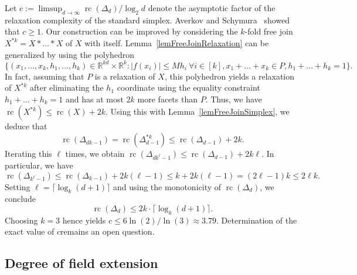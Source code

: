 \documentclass[11pt]{article}
\newcommand{\rc}{\operatorname{rc}}
\newcommand{\R}{\mathbb{R}}
\begin{document}
Let $c := \limsup_{d \to \infty} \rc(\Delta_d)/\log_2 d$ denote the asymptotic factor of the relaxation complexity of the standard simplex.
Averkov and Schymura~\cite{Averkov2022} showed that $c \ge 1$.
Our construction can be improved by considering the $k$-fold free join $X^{\ast k} = X \ast \dots \ast X$ of $X$ with itself.
Lemma~\ref{lemFreeJoinRelaxation} can be generalized by using the polyhedron
\[
    \{(x_1, \dots, x_k, h_1, \dots, h_k) \in \R^{kd} \times \R^k: |f(x_i)| \le M h_i \ \forall i \in [k], x_1 + \dots + x_k \in P, h_1 + \dots + h_k = 1 \}.
\]
In fact, assuming that $P$ is a relaxation of $X$, this
polyhedron yields a relaxation of $X^{\ast k}$ after eliminating the $h_1$ coordinate using the equality constraint $h_1 + \dots + h_k = 1$ and has at most $2k$ more facets than $P$.
Thus, we have $\rc(X^{\ast k}) \le \rc(X) + 2k$.
Using this with Lemma~\ref{lemFreeJoinSimplex}, we deduce that
\begin{equation}
    \label{eqRcMultiple}
    \rc(\Delta_{dk - 1}) = \rc(\Delta_{d-1}^{\ast k}) \le \rc(\Delta_{d-1}) + 2k.
\end{equation}
Iterating this $\ell$ times, we obtain $\rc(\Delta_{dk^\ell - 1}) \le \rc(\Delta_{d-1}) + 2 k \ell$. In particular, we have
\[
    \rc(\Delta_{k^\ell - 1}) \le \rc(\Delta_{k-1}) + 2 k (\ell-1) \le k + 2k (\ell-1) = (2\ell - 1)k \le 2\ell k.
\]
Setting $\ell = \lceil \log_k (d+1) \rceil$ and using the monotonicity of $\rc(\Delta_d)$, we conclude
\begin{equation}
    \label{eqRcGeneral}
    \rc(\Delta_d) \le 2k\cdot \lceil \log_k (d+1) \rceil.
\end{equation}
Choosing $k = 3$ hence yields $c \le 6 \ln(2)/\ln(3) \approx 3.79$.
Determination of the exact value of $c$remains an open question.

\subsection{Degree of field extension}
\end{document}
